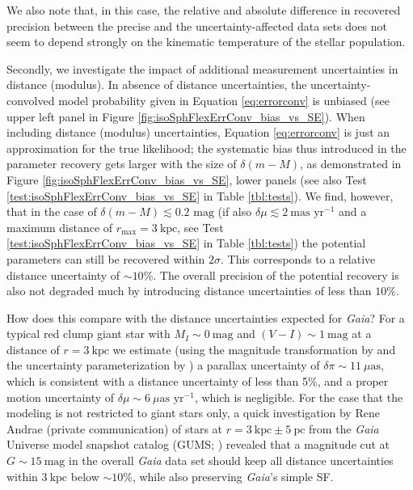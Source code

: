 \documentclass[iop,revtex4,numberedappendix,appendixfloats]{emulateapj}
\begin{document}
We also note that, in this case, the relative and absolute difference in recovered precision between the precise and the uncertainty-affected data sets does not seem to depend strongly on the kinematic temperature of the stellar population.

Secondly, we investigate the impact of additional measurement uncertainties in distance (modulus). In absence of distance uncertainties, the uncertainty-convolved model probability given in Equation \eqref{eq:errorconv} is unbiased (see upper left panel in Figure \ref{fig:isoSphFlexErrConv_bias_vs_SE}). When including distance (modulus) uncertainties, Equation \eqref{eq:errorconv} is just an approximation for the true likelihood; the systematic bias thus introduced in the parameter recovery gets larger with the size of $\delta (m-M)$, as demonstrated in Figure \ref{fig:isoSphFlexErrConv_bias_vs_SE}, lower panels (see also Test \ref{test:isoSphFlexErrConv_bias_vs_SE} in Table \ref{tbl:tests}). We find, however, that in the case of $\delta(m-M) \lesssim 0.2 \text{ mag}$ (if also $\delta \mu \lesssim 2 ~\text{mas yr}^{-1}$ and a maximum distance of $r_\text{max} = 3~\text{kpc}$, see Test \ref{test:isoSphFlexErrConv_bias_vs_SE} in Table \ref{tbl:tests}) the potential parameters can still be recovered within $2 \sigma$. This corresponds to a relative distance uncertainty of $\sim10\%$. The overall precision of the potential recovery is also not degraded much by introducing distance uncertainties of less than $10\%$.

How does this compare with the distance uncertainties expected for \emph{Gaia}? For a typical red clump giant star with $M_I\sim0~\text{mag}$ and $(V-I)\sim1~\text{mag}$ at a distance of $r=3~\text{kpc}$ we estimate (using the magnitude transformation by \citet{2010A&A...523A..48J} and the uncertainty parameterization by \citet{2014EAS....67...23D}) a parallax uncertainty of $\delta\pi\sim11~\mu\text{as}$, which is consistent with a distance uncertainty of less than 5\%, and a proper motion uncertainty of $\delta \mu\sim6~\mu\text{as yr}^{-1}$, which is negligible. For the case that the modeling is not restricted to giant stars only, a quick investigation by Rene Andrae (private communication) of stars at $r=3~\text{kpc}\pm5~\text{pc}$ from the \emph{Gaia} Universe model snapshot catalog (GUMS; \citealt{2012A&A...543A.100R}) revealed that a magnitude cut at $G\sim15~\text{mag}$ in the overall \emph{Gaia} data set should keep all distance uncertainties within $3~\text{kpc}$ below $\sim10\%$, while also preserving \emph{Gaia}'s simple SF.
\end{document}
